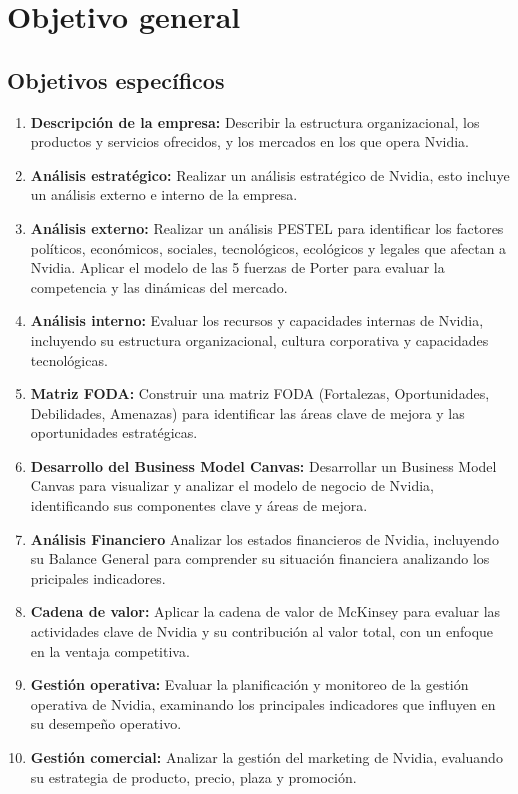 \documentclass{article}
\newenvironment{objetivoGeneral}{\section{Objetivo general}}{}
\begin{document}
\begin{objetivoGeneral}
  \subsection{Objetivos específicos}
  \vspace{-0.5cm}
  \begin{multicols}{2}
    \begin{enumerate}
      \item \textbf{Descripción de la empresa:} Describir la estructura organizacional, los productos y servicios ofrecidos, y los mercados en los que opera Nvidia.
      \item \textbf{Análisis estratégico:} Realizar un análisis estratégico de Nvidia, esto incluye un análisis externo e interno de la empresa.
      \item \textbf{Análisis externo:} Realizar un análisis PESTEL para identificar los factores políticos, económicos, sociales, tecnológicos, ecológicos y legales que afectan a Nvidia.
      \subitem Aplicar el modelo de las 5 fuerzas de Porter para evaluar la competencia y las dinámicas del mercado.
      \item \textbf{Análisis interno:} Evaluar los recursos y capacidades internas de Nvidia, incluyendo su estructura organizacional, cultura corporativa y capacidades tecnológicas.
      \item \textbf{Matriz FODA:} Construir una matriz FODA (Fortalezas, Oportunidades, Debilidades, Amenazas) para identificar las áreas clave de mejora y las oportunidades estratégicas.
      \item \textbf{Desarrollo del Business Model Canvas:} Desarrollar un Business Model Canvas para visualizar y analizar el modelo de negocio de Nvidia, identificando sus componentes clave y áreas de mejora.
      \item \textbf{Análisis Financiero} Analizar los estados financieros de Nvidia, incluyendo su Balance General para comprender su situación financiera analizando los pricipales indicadores.
      \item \textbf{Cadena de valor:} Aplicar la cadena de valor de McKinsey para evaluar las actividades clave de Nvidia y su contribución al valor total, con un enfoque en la ventaja competitiva.
      \item \textbf{Gestión operativa:} Evaluar la planificación y monitoreo de la gestión operativa de Nvidia, examinando los principales indicadores que influyen en su desempeño operativo.
      \item \textbf{Gestión comercial:} Analizar la gestión del marketing de Nvidia, evaluando su estrategia de producto, precio, plaza y promoción.

\end{enumerate}
\end{multicols}
\end{objetivoGeneral}
\end{document}
